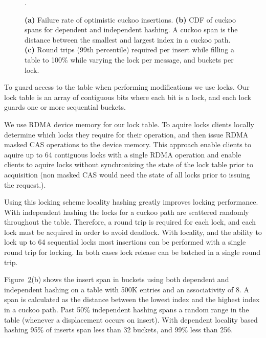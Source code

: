 \begin{figure}[t]
\begin{subfigure}{0.3\linewidth}
        \label{fig:tbd}
    \end{subfigure}.
    \vspace{-1em}
    \caption{
    \textbf{(a)} Failure rate of optimistic cuckoo insertions.
    \textbf{(b)} CDF of cuckoo spans for dependent and independent hashing. A cuckoo span is the distance between the smallest and largest index in a cuckoo path.
    \textbf{(c)} Round trips (99th percentile) required per insert while filling a table to 100\% while varying the lock per message, and buckets per lock. 
    }
    \label{fig:cuckoo-problems}

\end{figure}

To guard access to the table when performing modifications
we use locks. Our lock table is an array of contiguous bits
where each bit is a lock, and each lock guards one or more
sequential buckets.

We use RDMA device memory for our lock table. To aquire
locks clients locally determine which locks they require for
their operation, and then issue RDMA masked CAS operations
to the device memory. This approach enable clients to aquire
up to 64 contiguous locks with a single RDMA operation and
enable clients to aquire locks without synchronizing the
state of the lock table prior to acquisition (non masked CAS
would need the state of all locks prior to issuing the
request.).

Using this locking scheme locality hashing greatly improves
locking performance. With independent hashing the locks for
a cuckoo path are scattered randomly throughout the table.
Therefore, a round trip is required for each lock, and each
lock must be acquired in order to avoid deadlock. With
locality, and the ability to lock up to 64 sequential locks
most insertions can be performed with a single round trip
for locking. In both cases lock release can be batched in a
single round trip.

Figure~\ref{fig:cuckoo-problems}(b) shows the insert span in
buckets using both dependent and independent hashing on a
table with 500K entries and an associativity of 8. A span is
calculated as the distance between the lowest index and the
highest index in a cuckoo path. Past 50\% independent
hashing spans a random range in the table (whenever a
displacement occurs on insert). With dependent locality
based hashing 95\% of inserts span less than 32 buckets, and
99\% less than 256.


